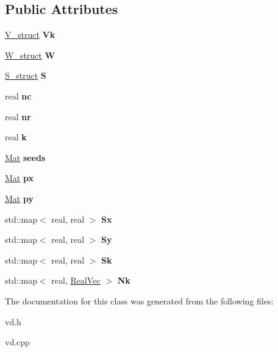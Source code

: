 \subsection*{Public Attributes}
\begin{DoxyCompactItemize}
\item 
\mbox{\label{classvd_aca8bd9fa239b6fadf3b3a25e5c17557e}} 
\mbox{\hyperlink{structV__struct}{V\+\_\+struct}} {\bfseries Vk}
\item 
\mbox{\label{classvd_ab23d33e6c11c46ad3302a874a4726542}} 
\mbox{\hyperlink{structW__struct}{W\+\_\+struct}} {\bfseries W}
\item 
\mbox{\label{classvd_a047f87d1fc7c8fea5f6cc4f6d4f228fa}} 
\mbox{\hyperlink{structS__struct}{S\+\_\+struct}} {\bfseries S}
\item 
\mbox{\label{classvd_a989a61c00de8a517c1093aba6f7d1b22}} 
real {\bfseries nc}
\item 
\mbox{\label{classvd_a04271075413d6082dad757da678d0181}} 
real {\bfseries nr}
\item 
\mbox{\label{classvd_a0cbfe9c7ca1e17901cc232d57352f200}} 
real {\bfseries k}
\item 
\mbox{\label{classvd_aebb5bd18cba152453d0c74134c233d0e}} 
\mbox{\hyperlink{aux_8h_aa1fe91b8cd36c618282eb0d548690c4c}{Mat}} {\bfseries seeds}
\item 
\mbox{\label{classvd_afc15550440d0c6bc61d917f4ac75aa75}} 
\mbox{\hyperlink{aux_8h_aa1fe91b8cd36c618282eb0d548690c4c}{Mat}} {\bfseries px}
\item 
\mbox{\label{classvd_a71b266194d117645ce8a3aeee98499f9}} 
\mbox{\hyperlink{aux_8h_aa1fe91b8cd36c618282eb0d548690c4c}{Mat}} {\bfseries py}
\item 
\mbox{\label{classvd_a2c1599932c0909f80abd6cf7601940f6}} 
std\+::map$<$ real, real $>$ {\bfseries Sx}
\item 
\mbox{\label{classvd_abfa4f5d8305394eed7e36fabbb65e782}} 
std\+::map$<$ real, real $>$ {\bfseries Sy}
\item 
\mbox{\label{classvd_a8b0e7202fac9d8411a0b3d1e6960bf5e}} 
std\+::map$<$ real, real $>$ {\bfseries Sk}
\item 
\mbox{\label{classvd_a417f0bd0c1c54c7d927352df356134b6}} 
std\+::map$<$ real, \mbox{\hyperlink{aux_8h_ac0a1a538b45426e056715d1f59f854ab}{Real\+Vec}} $>$ {\bfseries Nk}
\end{DoxyCompactItemize}


The documentation for this class was generated from the following files\+:\begin{DoxyCompactItemize}
\item 
vd.\+h\item 
vd.\+cpp\end{DoxyCompactItemize}
